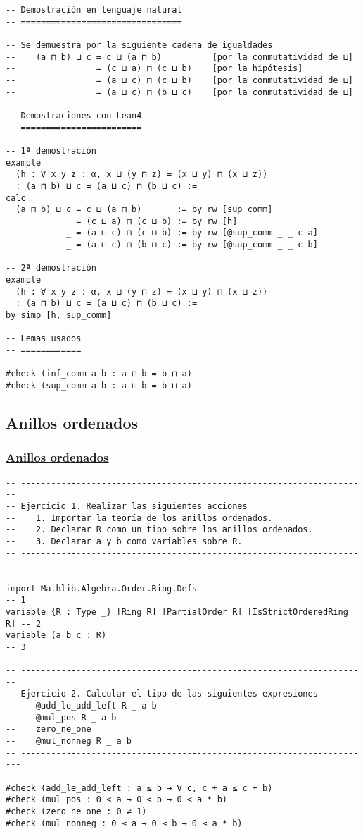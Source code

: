 \begin{verbatim}
-- Demostración en lenguaje natural
-- ================================

-- Se demuestra por la siguiente cadena de igualdades
--    (a ⊓ b) ⊔ c = c ⊔ (a ⊓ b)          [por la conmutatividad de ⊔]
--                = (c ⊔ a) ⊓ (c ⊔ b)    [por la hipótesis]
--                = (a ⊔ c) ⊓ (c ⊔ b)    [por la conmutatividad de ⊔]
--                = (a ⊔ c) ⊓ (b ⊔ c)    [por la conmutatividad de ⊔]

-- Demostraciones con Lean4
-- ========================

-- 1ª demostración
example
  (h : ∀ x y z : α, x ⊔ (y ⊓ z) = (x ⊔ y) ⊓ (x ⊔ z))
  : (a ⊓ b) ⊔ c = (a ⊔ c) ⊓ (b ⊔ c) :=
calc
  (a ⊓ b) ⊔ c = c ⊔ (a ⊓ b)       := by rw [sup_comm]
            _ = (c ⊔ a) ⊓ (c ⊔ b) := by rw [h]
            _ = (a ⊔ c) ⊓ (c ⊔ b) := by rw [@sup_comm _ _ c a]
            _ = (a ⊔ c) ⊓ (b ⊔ c) := by rw [@sup_comm _ _ c b]

-- 2ª demostración
example
  (h : ∀ x y z : α, x ⊔ (y ⊓ z) = (x ⊔ y) ⊓ (x ⊔ z))
  : (a ⊓ b) ⊔ c = (a ⊔ c) ⊓ (b ⊔ c) :=
by simp [h, sup_comm]

-- Lemas usados
-- ============

#check (inf_comm a b : a ⊓ b = b ⊓ a)
#check (sup_comm a b : a ⊔ b = b ⊔ a)
\end{verbatim}

\subsection{Anillos ordenados}
\label{sec:orgf7f9910}

\subsubsection{\href{./src/Basicos/Anillos\_ordenados.lean}{Anillos ordenados}}
\label{sec:orgebbba04}
\begin{verbatim}
-- ---------------------------------------------------------------------
-- Ejercicio 1. Realizar las siguientes acciones
--    1. Importar la teoría de los anillos ordenados.
--    2. Declarar R como un tipo sobre los anillos ordenados.
--    3. Declarar a y b como variables sobre R.
-- ----------------------------------------------------------------------

import Mathlib.Algebra.Order.Ring.Defs                                  -- 1
variable {R : Type _} [Ring R] [PartialOrder R] [IsStrictOrderedRing R] -- 2
variable (a b c : R)                                                    -- 3

-- ---------------------------------------------------------------------
-- Ejercicio 2. Calcular el tipo de las siguientes expresiones
--    @add_le_add_left R _ a b
--    @mul_pos R _ a b
--    zero_ne_one
--    @mul_nonneg R _ a b
-- ----------------------------------------------------------------------

#check (add_le_add_left : a ≤ b → ∀ c, c + a ≤ c + b)
#check (mul_pos : 0 < a → 0 < b → 0 < a * b)
#check (zero_ne_one : 0 ≠ 1)
#check (mul_nonneg : 0 ≤ a → 0 ≤ b → 0 ≤ a * b)
\end{verbatim}

